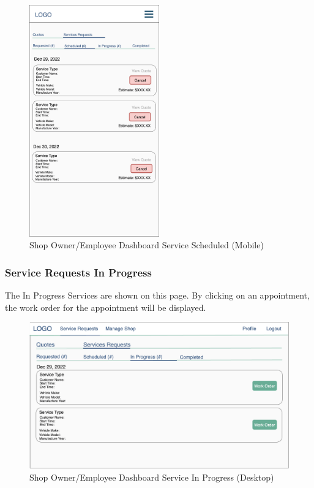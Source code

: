 \documentclass[12pt, titlepage]{article}
\begin{document}
\begin{figure}[H]
	\centering
	\includegraphics[width=0.5\textwidth]{mockups/Shop Owner Dashboard (Service Requests - Scheduled) (Mobile).png}
	\caption{Shop Owner/Employee Dashboard \textemdash{} Service \textemdash{} Scheduled (Mobile)}
\end{figure}

\subsubsection{Service Requests \textemdash{} In Progress} The In Progress Services are shown on this page. By clicking on an appointment, the
work order for the appointment will be displayed.

\begin{figure}[H]
	\centering
	\includegraphics[width=\textwidth]{mockups/Shop Owner Dashboard (Service Requests - In Progress) (Desktop).png}
	\caption{Shop Owner/Employee Dashboard \textemdash{} Service \textemdash{} In Progress (Desktop)}
\end{figure}
\end{document}
